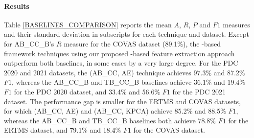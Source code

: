 \paragraph{Results} Table \ref{BASELINES_COMPARISON} reports the mean $A$, $R$, $P$ and $F1$ measures and their standard deviation in subscripts for each technique and dataset. Except for AB\_CC\_B's $R$ measure for the COVAS dataset (89.1\%), the -based framework techniques using our proposed -based feature extraction approach outperform both baselines, in some cases by a very large degree. For the PDC 2020 and 2021 datasets, the (AB\_CC, AE) technique achieves 97.3\% and 87.2\% $F1$, whereas the AB\_CC\_B and TB\_CC\_B baselines achieve 36.1\% and 19.4\% $F1$ for the PDC 2020 dataset, and 33.4\% and 56.6\% $F1$ for the PDC 2021 dataset. The performance gap is smaller for the ERTMS and COVAS datasets, for which (AB\_CC, AE) and (AB\_CC, KPCA) achieve 85.2\% and 88.5\% $F1$, whereas the AB\_CC\_B and TB\_CC\_B baselines both achieve 78.8\% $F1$ for the ERTMS dataset, and 79.1\% and 18.4\% $F1$ for the COVAS dataset.

